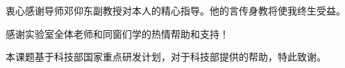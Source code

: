 
\begin{acknowledgements}
  衷心感谢导师邓仰东副教授对本人的精心指导。他的言传身教将使我终生受益。
  
  感谢实验室全体老师和同窗们学的热情帮助和支持！

  本课题基于科技部国家重点研发计划，对于科技部提供的帮助，特此致谢。
\end{acknowledgements}
